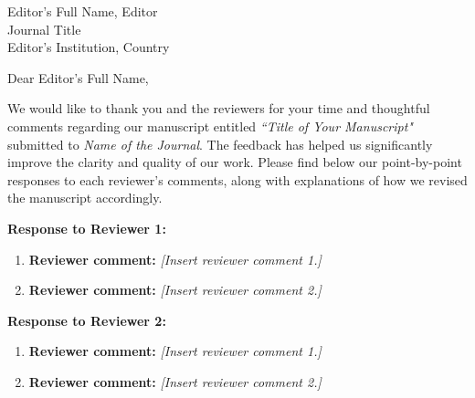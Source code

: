 \documentclass{letter}
\date{\today}
\newcommand{\EditorName}{Editor's Full Name}
\newcommand{\EditorAffiliation}{Editor\\Journal Title\\Editor's Institution, Country}
\newcommand{\ManuscriptTitle}{Title of Your Manuscript}
\newcommand{\JournalName}{Name of the Journal}
\begin{document}
\begin{letter}{\EditorName, \EditorAffiliation}

\opening{Dear \EditorName,}

We would like to thank you and the reviewers for your time and thoughtful comments regarding our manuscript entitled \textit{``\ManuscriptTitle"} submitted to \textit{\JournalName}. The feedback has helped us significantly improve the clarity and quality of our work. Please find below our point-by-point responses to each reviewer's comments, along with explanations of how we revised the manuscript accordingly.

\vspace{0.5cm}
\textbf{Response to Reviewer 1:}
\begin{enumerate}[label=1.\arabic*]

\item \textbf{Reviewer comment:} \textit{[Insert reviewer comment 1.]}
    \begin{tcolorbox}
    \end{tcolorbox}

\item \textbf{Reviewer comment:} \textit{[Insert reviewer comment 2.]}
    \begin{tcolorbox}
    \end{tcolorbox}


\end{enumerate}

\vspace{0.5cm}
\textbf{Response to Reviewer 2:}
\begin{enumerate}[label=2.\arabic*]

\item \textbf{Reviewer comment:} \textit{[Insert reviewer comment 1.]}
    \begin{tcolorbox}
    \end{tcolorbox}

\item \textbf{Reviewer comment:} \textit{[Insert reviewer comment 2.]}
    \begin{tcolorbox}
    \end{tcolorbox}


\end{enumerate}
\end{letter}
\end{document}
